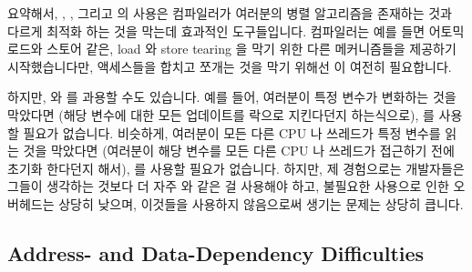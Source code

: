 요약해서, , , 그리고  의 사용은
컴파일러가 여러분의 병렬 알고리즘을 존재하는 것과 다르게 최적화 하는 것을
막는데 효과적인 도구들입니다.
컴파일러는 예를 들면  어토믹 로드와 스토어 같은, load
와 store tearing 을 막기 위한 다른 메커니즘들을 제공하기 시작했습니다만,
액세스들을 합치고 쪼개는 것을 막기 위해선  이 여전히 필요합니다.

하지만,  와  를 과용할 수도 있습니다.
예를 들어, 여러분이 특정 변수가 변화하는 것을 막았다면 (해당 변수에 대한 모든
업데이트를 락으로 지킨다던지 하는식으로),  를 사용할 필요가
없습니다.
비슷하게, 여러분이 모든 다른 CPU 나 쓰레드가 특정 변수를 읽는 것을 막았다면
(여러분이 해당 변수를 모든 다른 CPU 나 쓰레드가 접근하기 전에 초기화 한다던지
해서),  를 사용할 필요가 없습니다.
하지만, 제 경험으로는 개발자들은 그들이 생각하는 것보다 더 자주
 와  같은 걸 사용해야 하고, 불필요한 사용으로
인한 오버헤드는 상당히 낮으며, 이것들을 사용하지 않음으로써 생기는 문제는
상당히 큽니다.

\subsection{Address- and Data-Dependency Difficulties}
\label{sec:memorder:Address- and Data-Dependency Difficulties}

